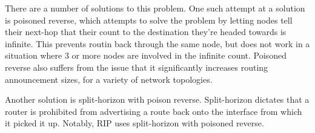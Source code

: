 There are a number of solutions to this problem. One such attempt at
a solution is poisoned reverse, which attempts to solve the problem by
letting nodes tell their next-hop that their count to the destination
they're headed towards is infinite. This prevents routin back through
the same node, but does not work in a situation where 3 or more nodes
are involved in the infinite count. Poisoned reverse also suffers from
the issue that it significantly increases routing announcement sizes,
for a variety of network topologies.

Another solution is split-horizon with poison reverse. Split-horizon
dictates that a router is prohibited from advertising a route back
onto the interface from which it picked it up. Notably, RIP uses
split-horizon with poisoned reverse.



